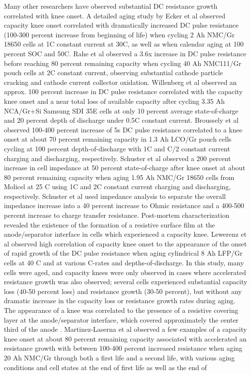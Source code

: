 \documentclass{article}
\begin{document}
Many other researchers have observed substantial DC resistance growth correlated with knee onset. A detailed aging study by Ecker et al \cite{ecker_calendar_2014} observed capacity knee onset correlated with dramatically increased DC pulse resistance (100-300 percent increase from beginning of life) when cycling 2 Ah NMC/Gr 18650 cells at 1C constant current at 30C, as well as when calendar aging at 100 percent SOC and 50C. Rahe et al \cite{rahe_nanoscale_2019} observed a 3.6x increase in DC pulse resistance before reaching 80 percent remaining capacity when cycling 40 Ah NMC111/Gr pouch cells at 2C constant current, observing substantial cathode particle cracking and cathode current collector oxidation. Willenberg et al \cite{willenberg_development_2020} observed an approx. 100 percent increase in DC pulse resistance correlated with the capacity knee onset and a near total loss of available capacity after cycling 3.35 Ah NCA/Gr+Si Samsung SDI 35E cells at only 10 percent average state-of-charge and 20 percent depth of discharge under 0.5C constant current. Broussely et al \cite{broussely_main_2005} observed 100-400 percent increase of 5s DC pulse resistance correlated to a knee onset at about 70 percent remaining capacity in 1.3 Ah LCO/Gr pouch cells cycling at 100 percent depth-of-discharge with 1C and C/2 constant current charging and discharging, respectively. Schuster et al \cite{schuster_nonlinear_2015} observed a 200 percent increase in cell impedance at 50 percent state-of-charge after knee onset at about 80 percent remaining capacity when aging 1.95 Ah NMC/Gr 18650 cells from Molicel at 25 C using 1C and 2C constant current charging and discharging, respectively. Schuster et al used impedance analysis to separate the overall impedance increase into a 40 percent increase to Ohmic resistance and a 400-500 percent increase to charge transfer resistance. Post-mortem characterization revealed the existence of the formation of a resistive surface film at the anode/separator interface in cells which experienced a capacity knee. Lewerenz et al \cite{lewerenz_systematic_2017, lewerenz_post-mortem_2017} observed high correlation of capacity knee onset to the appearance of the onset of rapid growth of the DC pulse resistance when aging cylindrical 8 Ah LFP/Gr cells at 40 C and at various C-rates and depths-of-discharge. In this study, many cells were aged, and capacity knees were only observed in cases where accelerated resistance growth was also observed; several cells experienced substantial capacity loss (40-50 percent loss) and resistance growth (30-50 percent), but without any dramatic increase in the capacity loss or resistance growth rates during aging. The appearance of a knee was correlated to the presence of a resistive covering layer at the anode/separator interface, which covered approximately the center third of the anode \cite{lewerenz_post-mortem_2017}. Martinez-Laserna et al \cite{martinez-laserna_technical_2018} observed a few examples of a capacity knee onset at about 80 percent remaining capacity associated with accelerated an resistance growth with between 100-400 percent increased resistance when aging 20 Ah NMC/Gr through both a first life and a second life, with various aging conditions and cell states at the end of first life as well as the end of 
\end{document}
